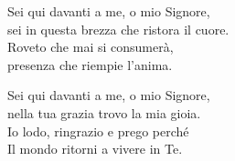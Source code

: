 
\strofa Sei qui davanti a me, o mio Signore,\\
sei in questa brezza che ristora il cuore.\\
Roveto che mai si consumerà,\\
presenza che riempie l'anima.

\spazio


\spazio

\strofa Sei qui davanti a me, o mio Signore,\\
nella tua grazia trovo la mia gioia.\\
Io lodo, ringrazio e prego perché\\
Il mondo ritorni a vivere in Te.

\spazio

